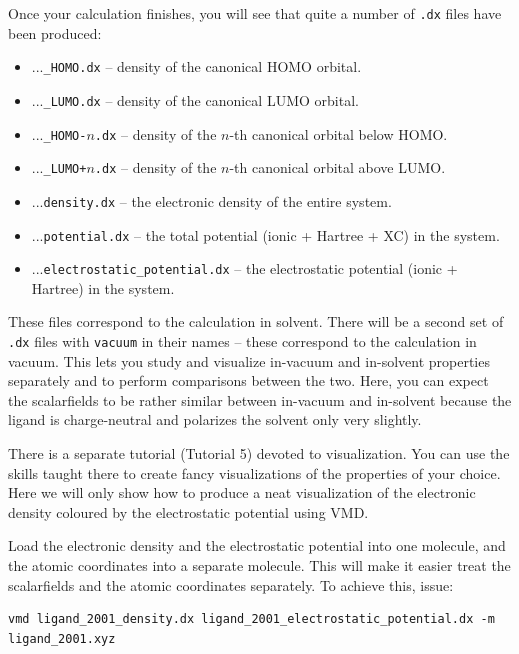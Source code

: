 \documentclass{article}
\begin{document}
Once your calculation finishes, you will see that quite a number of \texttt{.dx} files have been produced:
\begin{itemize}
    \item ...\texttt{\_HOMO.dx} -- density of the canonical HOMO orbital.
    \item ...\texttt{\_LUMO.dx} -- density of the canonical LUMO orbital.
    \item ...\texttt{\_HOMO-}$n$\texttt{.dx} -- density of the $n$-th canonical orbital below HOMO.    
    \item ...\texttt{\_LUMO+}$n$\texttt{.dx} -- density of the $n$-th canonical orbital above LUMO.    
    \item ...\texttt{density.dx} -- the electronic density of the entire system.
    \item ...\texttt{potential.dx} -- the total potential (ionic + Hartree + XC) in the system.
    \item ...\texttt{electrostatic\_potential.dx} -- the electrostatic potential (ionic + Hartree) in the system.
\end{itemize}
These files correspond to the calculation in solvent. There will be a second set of \texttt{.dx} files with \texttt{vacuum} in their names -- these correspond to the calculation in vacuum. This lets you study and visualize in-vacuum and in-solvent properties separately and to perform comparisons between the two. Here, you can expect the scalarfields to be rather similar between in-vacuum and in-solvent because the ligand is charge-neutral and polarizes the solvent only very slightly. 

There is a separate tutorial (Tutorial 5) devoted to visualization. You can use the skills taught there to create fancy visualizations of the properties of your choice. Here we will only show how to produce a neat visualization of the electronic density coloured by the electrostatic potential using VMD.

Load the electronic density and the electrostatic potential into one molecule, and the atomic coordinates into a separate molecule. This will make it easier treat the scalarfields and the atomic coordinates separately. To achieve this, issue:

\begin{verbatim}
vmd ligand_2001_density.dx ligand_2001_electrostatic_potential.dx -m ligand_2001.xyz    
\end{verbatim}
\end{document}
